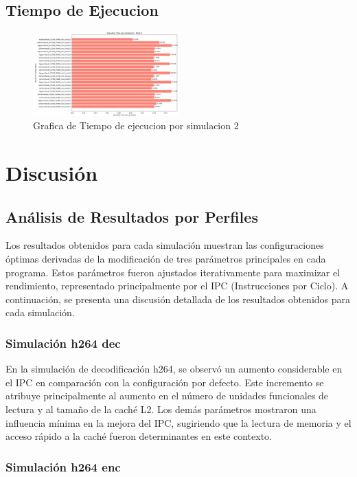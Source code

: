 \documentclass[conference]{IEEEtran}
\begin{document}
\subsection{Tiempo de Ejecucion}
\begin{figure}[htbp]
\centering
\includegraphics[width=0.5\textwidth]{Tiempo_Ejecucion_2.png}
\caption{Grafica de Tiempo de ejecucion por simulacion 2}
\label{fig:example}
\end{figure}
\newpage
\section{Discusión}

\subsection{Análisis de Resultados por Perfiles}

Los resultados obtenidos para cada simulación muestran las configuraciones óptimas derivadas de la modificación de tres parámetros principales en cada programa. Estos parámetros fueron ajustados iterativamente para maximizar el rendimiento, representado principalmente por el IPC (Instrucciones por Ciclo). A continuación, se presenta una discusión detallada de los resultados obtenidos para cada simulación.

\subsubsection{Simulación h264 dec}

En la simulación de decodificación h264, se observó un aumento considerable en el IPC en comparación con la configuración por defecto. Este incremento se atribuye principalmente al aumento en el número de unidades funcionales de lectura y al tamaño de la caché L2. Los demás parámetros mostraron una influencia mínima en la mejora del IPC, sugiriendo que la lectura de memoria y el acceso rápido a la caché fueron determinantes en este contexto.

\subsubsection{Simulación h264 enc}
\end{document}
